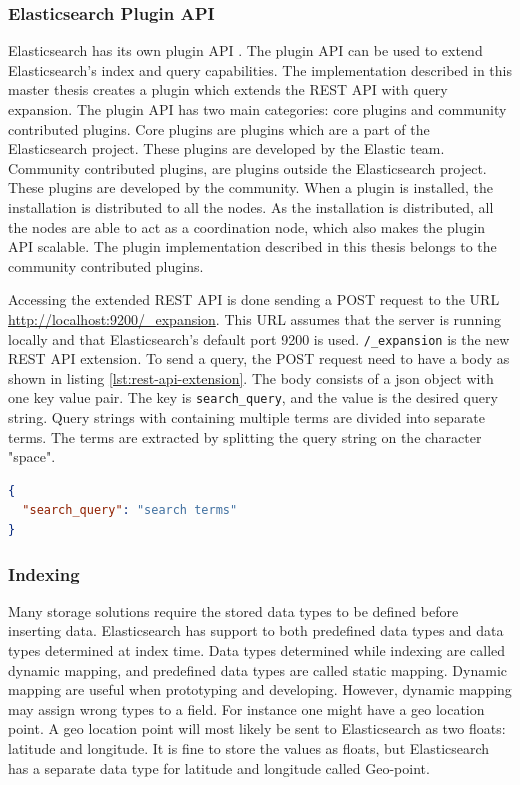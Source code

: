 \subsubsection{Elasticsearch Plugin API}
\label{sec:elasticsearch-plugin-api}
Elasticsearch has its own plugin API \cite{elasticsearch-plugin-api}.
The plugin API can be used to extend Elasticsearch's index and query capabilities.
The implementation described in this master thesis creates a plugin which extends the REST API with query expansion.
The plugin API has two main categories: core plugins and community contributed plugins.
Core plugins are plugins which are a part of the Elasticsearch project.
These plugins are developed by the Elastic team.
Community contributed plugins, are plugins outside the Elasticsearch project.
These plugins are developed by the community.
When a plugin is installed,
the installation is distributed to all the nodes.
As the installation is distributed,
all the nodes are able to act as a coordination node,
which also makes the plugin API scalable.
The plugin implementation described in this thesis belongs to the community contributed plugins.

Accessing the extended REST API is done sending a POST request to the URL \url{http://localhost:9200/_expansion}.
This URL assumes that the server is running locally and that Elasticsearch's default port 9200 is used.
\texttt{/\_expansion} is the new REST API extension.
To send a query, the POST request need to have a body as shown in listing \ref{lst:rest-api-extension}.
The body consists of a json object with one key value pair.
The key is \texttt{search\_query}, and the value is the desired query string.
Query strings with containing multiple terms are divided into separate terms.
The terms are extracted by splitting the query string on the character "space".

\begin{lstlisting}[language=json, caption={The POST request body for the implemented query expansion.}, label={lst:rest-api-extension}]
{
  "search_query": "search terms"
}
\end{lstlisting}

\subsubsection{Indexing}
Many storage solutions require the stored data types to be defined before inserting data.
Elasticsearch has support to both predefined data types and data types determined at index time.
Data types determined while indexing are called dynamic mapping, and predefined data types are called static mapping.
Dynamic mapping are useful when prototyping and developing.
However, dynamic mapping may assign wrong types to a field.
For instance one might have a geo location point.
A geo location point will most likely be sent to Elasticsearch as two floats: latitude and longitude.
It is fine to store the values as floats,
but Elasticsearch has a separate data type for latitude and longitude called Geo-point.

